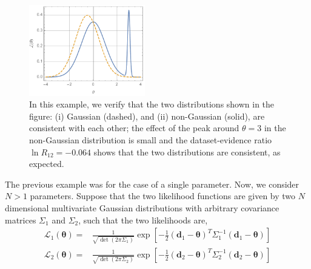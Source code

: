 \documentclass[amsmath, prd, reprint, aps]{revtex4-1}
\newcommand{\donev}{\textbf{d}_1}
\newcommand{\dtwov}{\textbf{d}_2}
\newcommand{\tv}{\bm{\theta}}
\begin{document}
\begin{figure}
\centering
	\includegraphics[width=0.45\textwidth]{nongaus1.pdf}
    \caption{In this example, we verify that the two distributions shown in the figure: (i) Gaussian (dashed), and (ii) non-Gaussian (solid), are consistent with each other; the effect of the peak around $\theta=3$ in the non-Gaussian distribution is small and the dataset-evidence ratio $\ln R_{12}=-0.064$ shows that the two distributions are consistent, as expected.}
    \label{fig:example1}
\end{figure}

The previous example was for the case of a single parameter. Now, we consider $N>1$ parameters. Suppose that the two likelihood functions are given by two $N$ dimensional multivariate Gaussian distributions with arbitrary covariance matrices $\Sigma_1$ and $\Sigma_2$, such that the two likelihoods are,
\begin{align}
\mathcal{L}_1(\tv) =& \frac{1}{\sqrt{\det(2\pi \Sigma_1)}} \exp\left[{-\frac{1}{2}}(\donev-\tv)^T \Sigma_1^{-1} (\donev-\tv)\right] \nonumber \\
\mathcal{L}_2(\tv) =& \frac{1}{\sqrt{\det(2\pi \Sigma_2)}} \exp\left[{-\frac{1}{2}}(\dtwov-\tv)^T \Sigma_2^{-1} (\dtwov-\tv)\right]
\end{align}
\end{document}
